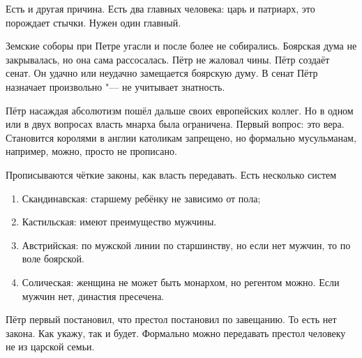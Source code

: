 Есть и другая причина. Есть два главных человека: царь и патриарх, это порождает стычки. Нужен один главный.

Земские соборы при Петре угасли и после более не собирались. Боярская дума не закрывалась, но она сама рассосалась. Пётр не жаловал чины. Пётр создаёт сенат. Он удачно или неудачно замещается боярскую думу. В сенат Пётр назначает произвольно "--- не учитывает знатность.

Пётр насаждая абсолютизм пошёл дальше своих европейских коллег. Но в одном или в двух вопросах власть мнарха была ограничена. Первый вопрос: это вера. Становится королями в англии католикам запрещено, но формально мусульманам, например, можно, просто не прописано.

Прописываются чёткие законы, как власть передавать. Есть несколько систем
\begin{enumerate}
\item Скандинавская: старшему ребёнку не зависимо от пола;
\item Кастильская: имеют преимущество мужчины.
\item Австрийская: по мужской линии по старшинству, но если нет мужчин, то по воле боярской.
\item Солическая: женщина не может быть монархом, но регентом можно. Если мужчин нет, династия пресечена. 
\end{enumerate}

Пётр первый постановил, что престол постановил по завещанию. То есть нет закона. Как укажу, так и будет. Формально можно передавать престол человеку не из царской семьи.

